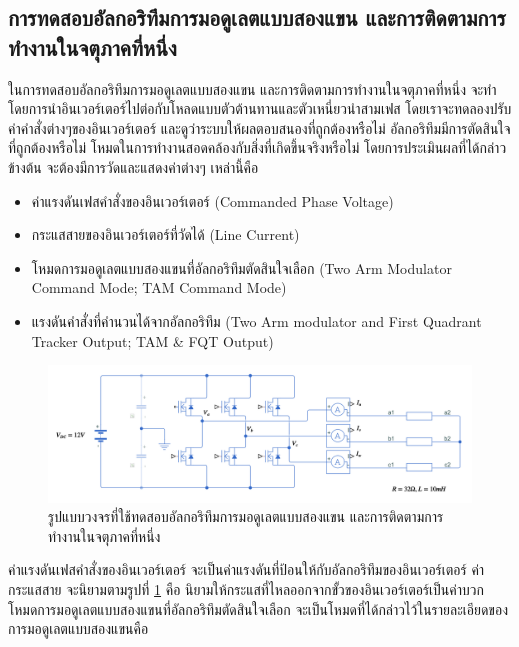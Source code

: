 \documentclass[11pt,a4paper]{article}
\begin{document}
\subsection{การทดสอบอัลกอริทึมการมอดูเลตแบบสองแขน และการติดตามการทำงานในจตุภาคที่หนึ่ง}

ในการทดสอบอัลกอริทึมการมอดูเลตแบบสองแขน และการติดตามการทำงานในจตุภาคที่หนึ่ง จะทำโดยการนำอินเวอร์เตอร์ไปต่อกับโหลดแบบตัวต้านทานและตัวเหนี่ยวนำสามเฟส โดยเราจะทดลองปรับค่าคำสั่งต่างๆของอินเวอร์เตอร์ และดูว่าระบบให้ผลตอบสนองที่ถูกต้องหรือไม่ อัลกอริทึมมีการตัดสินใจที่ถูกต้องหรือไม่ โหมดในการทำงานสอดคล้องกับสิ่งที่เกิดขึ้นจริงหรือไม่ โดยการประเมินผลที่ได้กล่าวข้างต้น จะต้องมีการวัดและแสดงค่าต่างๆ เหล่านี้คือ

\begin{itemize}
    \item ค่าแรงดันเฟสคำสั่งของอินเวอร์เตอร์ (Commanded Phase Voltage)
    \item กระแสสายของอินเวอร์เตอร์ที่วัดได้ (Line Current)
    \item โหมดการมอดูเลตแบบสองแขนที่อัลกอริทึมตัดสินใจเลือก (Two Arm Modulator Command Mode; TAM Command Mode)
    \item แรงดันคำสั่งที่คำนวนได้จากอัลกอริทึม (Two Arm modulator and First Quadrant Tracker Output; TAM \& FQT Output)
\end{itemize}

\begin{figure}[H]
    \centering
    \includegraphics[width=\textwidth]{ildef.png}
    \caption{รูปแบบวงจรที่ใช้ทดสอบอัลกอริทึมการมอดูเลตแบบสองแขน และการติดตามการทำงานในจตุภาคที่หนึ่ง}
    \label{ildef}
\end{figure}

ค่าแรงดันเฟสคำสั่งของอินเวอร์เตอร์ จะเป็นค่าแรงดันที่ป้อนให้กับอัลกอริทึมของอินเวอร์เตอร์ \newline ค่ากระแสสาย จะนิยามตามรูปที่ \ref{ildef} คือ นิยามให้กระแสที่ไหลออกจากขั้วของอินเวอร์เตอร์เป็นค่าบวก \newline โหมดการมอดูเลตแบบสองแขนที่อัลกอริทึมตัดสินใจเลือก จะเป็นโหมดที่ได้กล่าวไว้ในรายละเอียดของการมอดูเลตแบบสองแขนคือ
\end{document}
